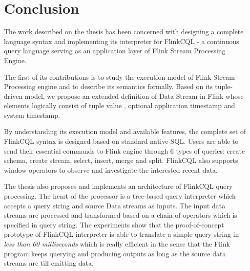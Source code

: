 
\chapter{Conclusion}

\ifpdf
    \graphicspath{{Chapter06/Figs/Raster/}{Chapter06/Figs/PDF/}{Chapter06/Figs/}}
\else
    \graphicspath{{Chapter06/Figs/Vector/}{Chapter06/Figs/}}
\fi


The work described on the thesis has been concerned with  designing  a complete language syntax and implementing its interpreter for FlinkCQL - a continuous query language serving as an application layer of Flink Stream Processing Engine. 

The first of its contributions is to study the execution model of Flink Stream Processing engine and to describe its semantics formally. Based on its tuple-driven model, we propose an extended definition of Data Stream in Flink whose elements logically consist of tuple value , optional application timestamp and system timestamp.  

By understanding its execution model and available features, the complete set of FlinkCQL syntax is designed based on standard native SQL. Users are able to send their essential commands to Flink engine through 6 types of queries: create schema, create stream, select, insert, merge and split. FlinkCQL also supports window operators to observe and investigate the interested recent  data.  

The thesis also proposes and implements an architecture of FlinkCQL query processing. The heart of the processor is a tree-based query interpreter which accepts a query string and source Data streams as inputs. The input data streams are processed and transformed based on a chain of operators which is specified in query string. The experiments show  that the proof-of-concept prototype of FlinkCQL interpreter is able to translate a simple query string in \textit{less than 60 milliseconds} which is really efficient in the sense that the Flink program keeps querying and producing outputs  as long as the source data streams are till emitting data. 




